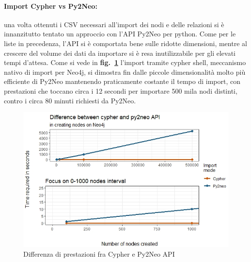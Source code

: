 \documentclass[fleqn,10pt]{SelfArx} %
\begin{document}
{{\paragraph{Import Cypher vs Py2Neo:} una volta ottenuti i CSV necessari all'import dei nodi e delle relazioni si è innanzitutto tentato un approccio con l'API Py2Neo per python. 
Come per le liste in precedenza, l'API si è comportata bene sulle ridotte dimensioni, mentre al crescere del volume dei dati da importare si è resa inutilizzabile per gli elevati tempi d'attesa. 
Come si vede in \textbf{fig.~\ref{plot_cypher_py2neo}} l'import tramite cypher shell, meccanismo nativo di import per Neo4j, si dimostra fin dalle piccole dimensionalità molto più efficiente di Py2Neo mantenendo praticamente costante il tempo di import, con prestazioni che toccano circa i 12 secondi per importare 500 mila nodi distinti, contro i circa 80 minuti richiesti da Py2Neo.
\begin{figure}
\centering
\includegraphics[scale=0.54]{viz_benchmark_cypher_py2neo.jpeg}
\vspace*{0.01cm}
\caption{\footnotesize \label{plot_cypher_py2neo} Differenza di prestazioni fra Cypher e Py2Neo API}
\end{figure}
\newpage
}}
\end{document}
